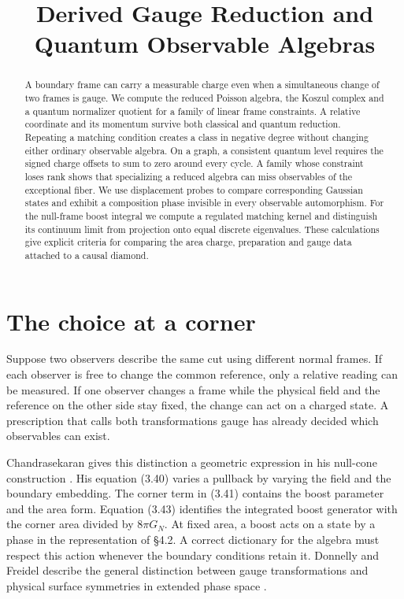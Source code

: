 \documentclass[11pt,letterpaper]{article}
\title{Derived Gauge Reduction and Quantum Observable Algebras\series{Part II}}
\begin{document}
\ifdefined\HCode\else{}\fi
\maketitle
\begin{abstract}
A boundary frame can carry a measurable charge even when a simultaneous change of two frames
is gauge. We compute the reduced Poisson algebra, the Koszul complex and a quantum normalizer
quotient for a family of linear frame constraints. A relative coordinate and its momentum
survive both classical and quantum reduction. Repeating a matching condition creates a class
in negative degree without changing either ordinary observable algebra. On a graph, a consistent
quantum level requires the signed charge offsets to sum to zero around every cycle. A family
whose constraint loses rank shows that specializing a reduced algebra can miss observables of
the exceptional fiber. We use displacement probes to compare corresponding Gaussian states
and exhibit a composition phase invisible in every observable automorphism. For the null-frame
boost integral we compute a regulated matching kernel and distinguish its continuum limit
from projection onto equal discrete eigenvalues. These calculations give explicit criteria
for comparing the area charge, preparation and gauge data attached to a causal diamond.
\end{abstract}

\section{The choice at a corner}
\label{sec:corner}
Suppose two observers describe the same cut using different normal frames. If each observer is
free to change the common reference, only a relative reading can be measured. If one observer
changes a frame while the physical field and the reference on the other side stay fixed, the
change can act on a charged state. A prescription that calls both transformations gauge has
already decided which observables can exist.

Chandrasekaran gives this distinction a geometric expression in his null-cone construction
\cite{nc}. His equation (3.40) varies a pullback by varying the field and the boundary
embedding. The corner term in (3.41) contains the boost parameter and the area form. Equation
(3.43) identifies the integrated boost generator with the corner area divided by $8\pi G_N$.
At fixed area, a boost acts on a state by a phase in the representation of \S4.2. A correct
dictionary for the algebra must respect this action whenever the boundary conditions retain
it. Donnelly and Freidel describe the general distinction between gauge transformations and
physical surface symmetries in extended phase space \cite{df}.
\end{document}
